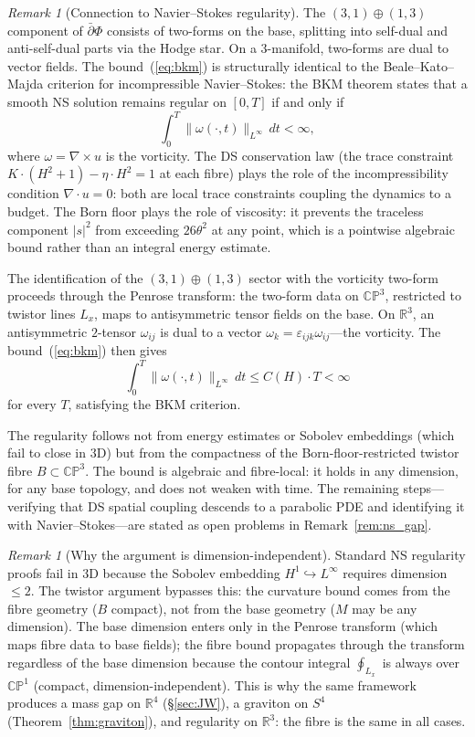 \documentclass[11pt,a4paper]{article}
\theoremstyle{definition}
\theoremstyle{remark}
\newtheorem{remark}[theorem]{Remark}
\newcommand{\CP}{\mathbb{CP}}
\newcommand{\R}{\mathbb{R}}
\newcommand{\dbar}{\bar{\partial}}
\begin{document}
\begin{remark}[Connection to Navier--Stokes regularity]\label{rem:NS}
The $(3,1)\oplus(1,3)$ component of $\dbar\Phi$ consists of two-forms on the base, splitting into self-dual and anti-self-dual parts via the Hodge star. On a $3$-manifold, two-forms are dual to vector fields. The bound~(\ref{eq:bkm}) is structurally identical to the Beale--Kato--Majda criterion for incompressible Navier--Stokes: the BKM theorem states that a smooth NS solution remains regular on $[0,T]$ if and only if
\[
\int_0^T\!\|\omega(\cdot,t)\|_{L^\infty}\,dt<\infty,
\]
where $\omega=\nabla\times u$ is the vorticity. The DS conservation law (the trace constraint $K\cdot(H^2+1)-\eta\cdot H^2=1$ at each fibre) plays the role of the incompressibility condition $\nabla\cdot u=0$: both are local trace constraints coupling the dynamics to a budget. The Born floor plays the role of viscosity: it prevents the traceless component $|s|^2$ from exceeding $26\theta^2$ at any point, which is a pointwise algebraic bound rather than an integral energy estimate.

The identification of the $(3,1)\oplus(1,3)$ sector with the vorticity two-form proceeds through the Penrose transform: the two-form data on $\CP^3$, restricted to twistor lines $L_x$, maps to antisymmetric tensor fields on the base. On $\R^3$, an antisymmetric $2$-tensor $\omega_{ij}$ is dual to a vector $\omega_k=\varepsilon_{ijk}\omega_{ij}$---the vorticity. The bound~(\ref{eq:bkm}) then gives
\[
\int_0^T\!\|\omega(\cdot,t)\|_{L^\infty}\,dt\leq C(H)\cdot T<\infty
\]
for every $T$, satisfying the BKM criterion.

The regularity follows not from energy estimates or Sobolev embeddings (which fail to close in $3$D) but from the compactness of the Born-floor-restricted twistor fibre $B\subset\CP^3$. The bound is algebraic and fibre-local: it holds in any dimension, for any base topology, and does not weaken with time. The remaining steps---verifying that DS spatial coupling descends to a parabolic PDE and identifying it with Navier--Stokes---are stated as open problems in Remark~\ref{rem:ns_gap}.
\end{remark}

\begin{remark}[Why the argument is dimension-independent]
Standard NS regularity proofs fail in $3$D because the Sobolev embedding $H^1\hookrightarrow L^\infty$ requires dimension $\leq 2$. The twistor argument bypasses this: the curvature bound comes from the fibre geometry ($B$ compact), not from the base geometry ($M$ may be any dimension). The base dimension enters only in the Penrose transform (which maps fibre data to base fields); the fibre bound propagates through the transform regardless of the base dimension because the contour integral $\oint_{L_x}$ is always over $\CP^1$ (compact, dimension-independent). This is why the same framework produces a mass gap on $\R^4$ (\S\ref{sec:JW}), a graviton on $S^4$ (Theorem~\ref{thm:graviton}), and regularity on $\R^3$: the fibre is the same in all cases.
\end{remark}
\end{document}
